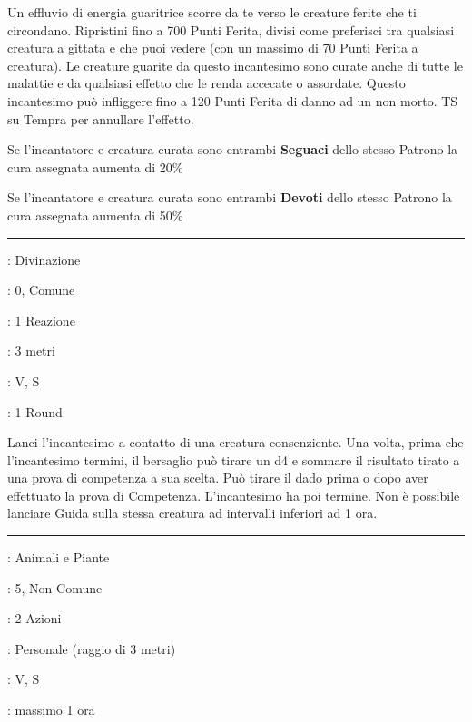 \begin{multicols}{2}
Un effluvio di energia guaritrice scorre da te verso le creature ferite che ti circondano. Ripristini fino a 700 Punti Ferita, divisi come preferisci tra qualsiasi creatura a gittata e che puoi vedere (con un massimo di 70 Punti Ferita a creatura). Le creature guarite da questo incantesimo sono curate anche di tutte le malattie e da qualsiasi effetto che le renda accecate o assordate. Questo incantesimo può infliggere fino a 120 Punti Ferita di danno ad un non morto. TS su Tempra per annullare l'effetto.

Se l'incantatore e creatura curata sono entrambi \textbf{Seguaci} dello stesso Patrono la cura assegnata aumenta di 20\%

Se l'incantatore e creatura curata sono entrambi \textbf{Devoti} dello stesso Patrono la cura assegnata aumenta di 50\%

\smallskip\noindent\rule{\linewidth}{2pt} \hypertarget{Guida}{}\medskip{}
\noindent
\begin{description}[noitemsep, topsep=0pt, parsep=0pt, partopsep=0pt, leftmargin=0cm, labelwidth=2.8cm]
	\item[\textbf{Lista di Magia}]: Divinazione
	\item[\textbf{Livello}]: 0, Comune
	\item[\textbf{T. di Lancio}]: 1 Reazione
	\item[\textbf{Gittata}]: 3 metri
	\item[\textbf{Componenti}]: V, S
	\item[\textbf{Durata}]: 1 Round
\end{description}

Lanci l'incantesimo a contatto di una creatura consenziente. Una volta, prima che l'incantesimo termini, il bersaglio può tirare un d4 e sommare il risultato tirato a una prova di competenza a sua scelta. Può tirare il dado prima o dopo aver effettuato la prova di Competenza. L'incantesimo ha poi termine. Non è possibile lanciare Guida sulla stessa creatura ad intervalli inferiori ad 1 ora.

\smallskip\noindent\rule{\linewidth}{2pt} \hypertarget{Guscio Anti-Vita}{}\medskip{}
\noindent
\begin{description}[noitemsep, topsep=0pt, parsep=0pt, partopsep=0pt, leftmargin=0cm, labelwidth=2.8cm]
	\item[\textbf{Lista di Magia}]: Animali e Piante
	\item[\textbf{Livello}]: 5, Non Comune
	\item[\textbf{T. di Lancio}]: 2 Azioni
	\item[\textbf{Gittata}]: Personale (raggio di 3 metri)
	\item[\textbf{Componenti}]: V, S
	\item[\textbf{Durata}]: massimo 1 ora
\end{description}


\end{multicols}
